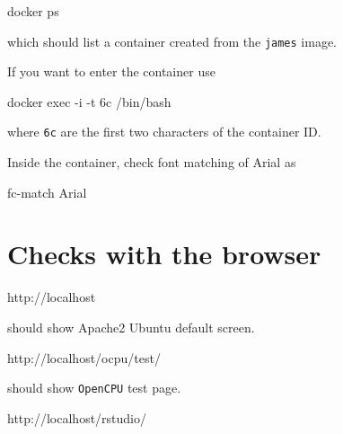 \documentclass[
]{book}
\newenvironment{Shaded}{\begin{snugshade}}{\end{snugshade}}
\newcommand{\AttributeTok}[1]{\textcolor[rgb]{0.77,0.63,0.00}{#1}}
\newcommand{\ExtensionTok}[1]{#1}
\newcommand{\NormalTok}[1]{#1}
\begin{document}
\begin{Shaded}
\begin{Highlighting}[]
\ExtensionTok{docker}\NormalTok{ ps}
\end{Highlighting}
\end{Shaded}

which should list a container created from the \texttt{james} image.

If you want to enter the container use

\begin{Shaded}
\begin{Highlighting}[]
\ExtensionTok{docker}\NormalTok{ exec }\AttributeTok{{-}i} \AttributeTok{{-}t}\NormalTok{ 6c /bin/bash}
\end{Highlighting}
\end{Shaded}

where \texttt{6c} are the first two characters of the container ID.

Inside the container, check font matching of Arial as

\begin{Shaded}
\begin{Highlighting}[]
\ExtensionTok{fc{-}match}\NormalTok{ Arial}
\end{Highlighting}
\end{Shaded}

\hypertarget{checks-with-the-browser}{%
\section{Checks with the browser}\label{checks-with-the-browser}}

\begin{Shaded}
\begin{Highlighting}[]
\ExtensionTok{http://localhost}
\end{Highlighting}
\end{Shaded}

should show Apache2 Ubuntu default screen.

\begin{Shaded}
\begin{Highlighting}[]
\ExtensionTok{http://localhost/ocpu/test/}
\end{Highlighting}
\end{Shaded}

should show \texttt{OpenCPU} test page.

\begin{Shaded}
\begin{Highlighting}[]
\ExtensionTok{http://localhost/rstudio/}
\end{Highlighting}
\end{Shaded}
\end{document}
